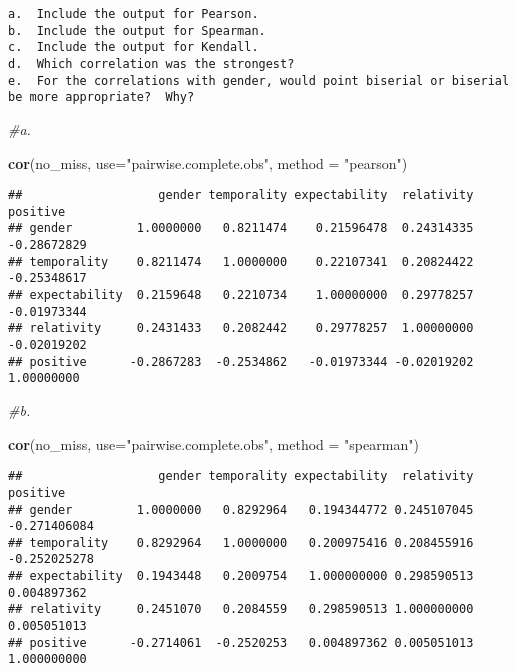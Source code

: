 \documentclass[
]{article}
\newenvironment{Shaded}{\begin{snugshade}}{\end{snugshade}}
\newcommand{\CommentTok}[1]{\textcolor[rgb]{0.56,0.35,0.01}{\textit{#1}}}
\newcommand{\DataTypeTok}[1]{\textcolor[rgb]{0.13,0.29,0.53}{#1}}
\newcommand{\KeywordTok}[1]{\textcolor[rgb]{0.13,0.29,0.53}{\textbf{#1}}}
\newcommand{\NormalTok}[1]{#1}
\newcommand{\StringTok}[1]{\textcolor[rgb]{0.31,0.60,0.02}{#1}}
\begin{document}
\begin{verbatim}
a.  Include the output for Pearson.
b.  Include the output for Spearman.
c.  Include the output for Kendall.
d.  Which correlation was the strongest?
e.  For the correlations with gender, would point biserial or biserial be more appropriate?  Why?
\end{verbatim}

\begin{Shaded}
\begin{Highlighting}[]
\CommentTok{#a.}

\KeywordTok{cor}\NormalTok{(no_miss, }\DataTypeTok{use=}\StringTok{"pairwise.complete.obs"}\NormalTok{, }\DataTypeTok{method =} \StringTok{"pearson"}\NormalTok{)}
\end{Highlighting}
\end{Shaded}

\begin{verbatim}
##                   gender temporality expectability  relativity    positive
## gender         1.0000000   0.8211474    0.21596478  0.24314335 -0.28672829
## temporality    0.8211474   1.0000000    0.22107341  0.20824422 -0.25348617
## expectability  0.2159648   0.2210734    1.00000000  0.29778257 -0.01973344
## relativity     0.2431433   0.2082442    0.29778257  1.00000000 -0.02019202
## positive      -0.2867283  -0.2534862   -0.01973344 -0.02019202  1.00000000
\end{verbatim}

\begin{Shaded}
\begin{Highlighting}[]
\CommentTok{#b.}

\KeywordTok{cor}\NormalTok{(no_miss, }\DataTypeTok{use=}\StringTok{"pairwise.complete.obs"}\NormalTok{, }\DataTypeTok{method =} \StringTok{"spearman"}\NormalTok{)}
\end{Highlighting}
\end{Shaded}

\begin{verbatim}
##                   gender temporality expectability  relativity     positive
## gender         1.0000000   0.8292964   0.194344772 0.245107045 -0.271406084
## temporality    0.8292964   1.0000000   0.200975416 0.208455916 -0.252025278
## expectability  0.1943448   0.2009754   1.000000000 0.298590513  0.004897362
## relativity     0.2451070   0.2084559   0.298590513 1.000000000  0.005051013
## positive      -0.2714061  -0.2520253   0.004897362 0.005051013  1.000000000
\end{verbatim}
\end{document}

